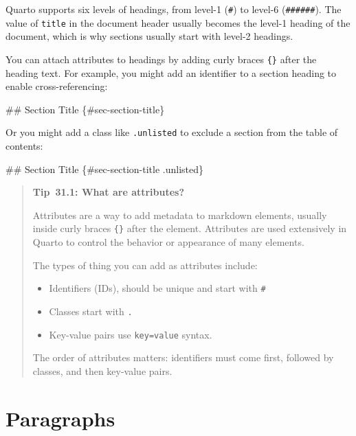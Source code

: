 \documentclass[
  letterpaper,
  DIV=11,
  numbers=noendperiod,
  oneside]{scrreprt}
\newenvironment{Shaded}{\begin{snugshade}}{\end{snugshade}}
\newcommand{\FunctionTok}[1]{\textcolor[rgb]{0.28,0.35,0.67}{#1}}
\providecommand{\tightlist}{%
  \setlength{\itemsep}{0pt}\setlength{\parskip}{0pt}}
\begin{document}
\begin{tcolorbox}
Quarto supports six levels of headings, from level-1 (\texttt{\#}) to
level-6 (\texttt{\#\#\#\#\#\#}). The value of \texttt{title} in the
document header usually becomes the level-1 heading of the document,
which is why sections usually start with level-2 headings.

You can attach attributes to headings by adding curly braces
\texttt{\{\}} after the heading text. For example, you might add an
identifier to a section heading to enable cross-referencing:

\begin{Shaded}
\begin{Highlighting}[]
\FunctionTok{\#\# Section Title \{\#sec{-}section{-}title\}}
\end{Highlighting}
\end{Shaded}

Or you might add a class like \texttt{.unlisted} to exclude a section
from the table of contents:

\begin{Shaded}
\begin{Highlighting}[]
\FunctionTok{\#\# Section Title \{\#sec{-}section{-}title .unlisted\}}
\end{Highlighting}
\end{Shaded}

\protect{}\label{tip-attributes}
\begin{quote}
\textbf{Tip~31.1: What are attributes?}

Attributes are a way to add metadata to markdown elements, usually
inside curly braces \texttt{\{\}} after the element. Attributes are used
extensively in Quarto to control the behavior or appearance of many
elements.

The types of thing you can add as attributes include:

\begin{itemize}
\tightlist
\item
  Identifiers (IDs), should be unique and start with \texttt{\#}
\item
  Classes start with \texttt{.}
\item
  Key-value pairs use
  \texttt{key=\textquotesingle{}value\textquotesingle{}} syntax.
\end{itemize}

The order of attributes matters: identifiers must come first, followed
by classes, and then key-value pairs.
\end{quote}

\section{Paragraphs}\label{paragraphs}


\end{tcolorbox}
\end{document}
